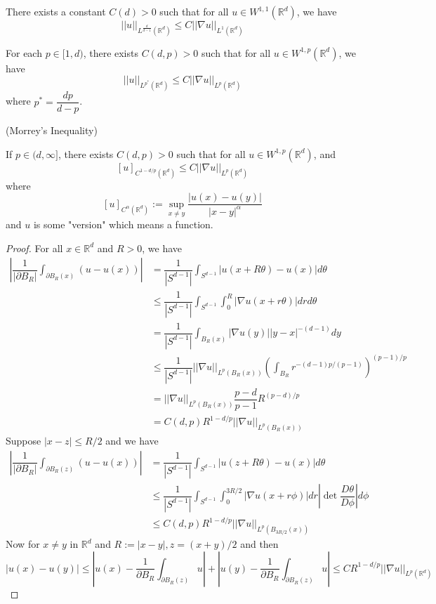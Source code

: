\begin{theorem}
    There exists a constant $C(d) > 0$ such that for all $u \in W^{1,1}(\mathbb{R}^d)$, we have
    \[
    ||u||_{L^{\tfrac{d}{d-1}}(\mathbb{R}^d)} \leq C||\nabla u||_{L^1(\mathbb{R}^d)}
    \]
\end{theorem}

\begin{corollary}
    For each $p\in[1,d)$, there exists $C(d,p) > 0$ such that for all $u\in W^{1,p}(\mathbb{R}^d)$, we have
    \[
    ||u||_{L^{p^*}(\mathbb{R}^d)} \leq C||\nabla u||_{L^p(\mathbb{R}^d)}
    \]
    where $p^* = \dfrac{dp}{d-p}$.
\end{corollary}

\begin{theorem}
    (Morrey's Inequality)\par
    If $p\in(d,\infty]$, there exists $C(d,p) > 0$ such that for all $u\in W^{1,p}(\mathbb{R}^d)$, and
    \[
    [u]_{C^{1-d/p}(\mathbb{R}^d)} \leq C||\nabla u||_{L^p(\mathbb{R}^d)}
    \]
    where
    \[
    [u]_{C^{\alpha}(\mathbb{R}^d)}:= \sup_{x\neq y}\dfrac{|u(x)-u(y)|}{|x-y|^{\alpha}}
    \]
    and $u$ is some "version" which means a function.
\end{theorem}
\begin{proof}
    For all $x\in\mathbb{R}^d$ and $R>0$, we have
    \[
    \begin{aligned}
        \left|\dfrac{1}{|\partial B_R|}\int_{\partial B_R(x)}(u-u(x))\right| &= \dfrac{1}{|S^{d-1}|} \int_{S^{d-1}} |u(x+R\theta) - u(x)|d\theta \\
        &\leq \dfrac{1}{|S^{d-1}|} \int_{S^{d-1}}\int_0^{R}|\nabla u(x+r\theta)|drd\theta \\
        &= \dfrac{1}{|S^{d-1}|} \int_{B_R(x)}|\nabla u(y)||y-x|^{-(d-1)}dy \\
        &\leq \dfrac{1}{|S^{d-1}|} ||\nabla u||_{L^p(B_R(x))} \left(\int_{B_R} r^{-(d-1)p/(p-1)}\right)^{(p-1)/p} \\
        &= ||\nabla u||_{L^p(B_R(x))} \dfrac{p-d}{p-1}R^{(p-d)/p} \\
        &=C(d,p)R^{1-d/p}||\nabla u||_{L^p(B_R(x))} 
    \end{aligned}
    \]
    Suppose $|x-z| \leq R/2$ and we have
    \[
    \begin{aligned}
        \left|\dfrac{1}{|\partial B_R|}\int_{\partial B_R(z)}(u-u(x))\right| &= \dfrac{1}{|S^{d-1}|} \int_{S^{d-1}} |u(z+R\theta) - u(x)|d\theta \\
        &\leq \dfrac{1}{|S^{d-1}|} \int_{S^{d-1}}\int_0^{3R/2}|\nabla u(x+r\phi)|dr\left|\det \dfrac{D\theta}{D\phi}\right|d\phi \\
        &\leq C(d,p)R^{1-d/p}||\nabla u||_{L^p(B_{3R/2}(x))}
    \end{aligned}
    \]
    Now for $x\neq y$ in $\mathbb{R}^d$ and $R:=|x-y|, z= (x+y)/2$ and then
    \[
    |u(x)-u(y)| \leq |u(x) - \dfrac{1}{\partial B_R}\int_{\partial B_R(z)} u| + |u(y) - \dfrac{1}{\partial B_R}\int_{\partial B_R(z)} u| \leq CR^{1-d/p}||\nabla u||_{L^p(\mathbb{R}^d)}
    \]
\end{proof}


